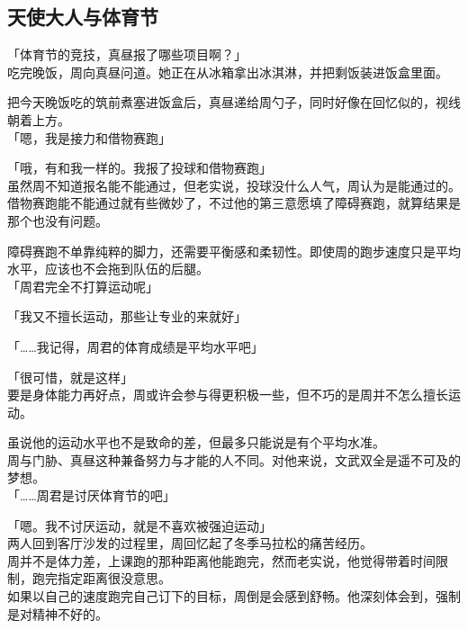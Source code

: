 \subsection{天使大人与体育节}

「体育节的竞技，真昼报了哪些项目啊？」\\

吃完晚饭，周向真昼问道。她正在从冰箱拿出冰淇淋，并把剩饭装进饭盒里面。

把今天晚饭吃的筑前煮塞进饭盒后，真昼递给周勺子，同时好像在回忆似的，视线朝着上方。\\

「嗯，我是接力和借物赛跑」

「哦，有和我一样的。我报了投球和借物赛跑」\\

虽然周不知道报名能不能通过，但老实说，投球没什么人气，周认为是能通过的。\\

借物赛跑能不能通过就有些微妙了，不过他的第三意愿填了障碍赛跑，就算结果是那个也没有问题。

障碍赛跑不单靠纯粹的脚力，还需要平衡感和柔韧性。即使周的跑步速度只是平均水平，应该也不会拖到队伍的后腿。\\

「周君完全不打算运动呢」

「我又不擅长运动，那些让专业的来就好」

「……我记得，周君的体育成绩是平均水平吧」

「很可惜，就是这样」\\

要是身体能力再好点，周或许会参与得更积极一些，但不巧的是周并不怎么擅长运动。

虽说他的运动水平也不是致命的差，但最多只能说是有个平均水准。\\

周与门胁、真昼这种兼备努力与才能的人不同。对他来说，文武双全是遥不可及的梦想。\\

「……周君是讨厌体育节的吧」

「嗯。我不讨厌运动，就是不喜欢被强迫运动」\\

两人回到客厅沙发的过程里，周回忆起了冬季马拉松的痛苦经历。\\

周并不是体力差，上课跑的那种距离他能跑完，然而老实说，他觉得带着时间限制，跑完指定距离很没意思。\\

如果以自己的速度跑完自己订下的目标，周倒是会感到舒畅。他深刻体会到，强制是对精神不好的。\\


